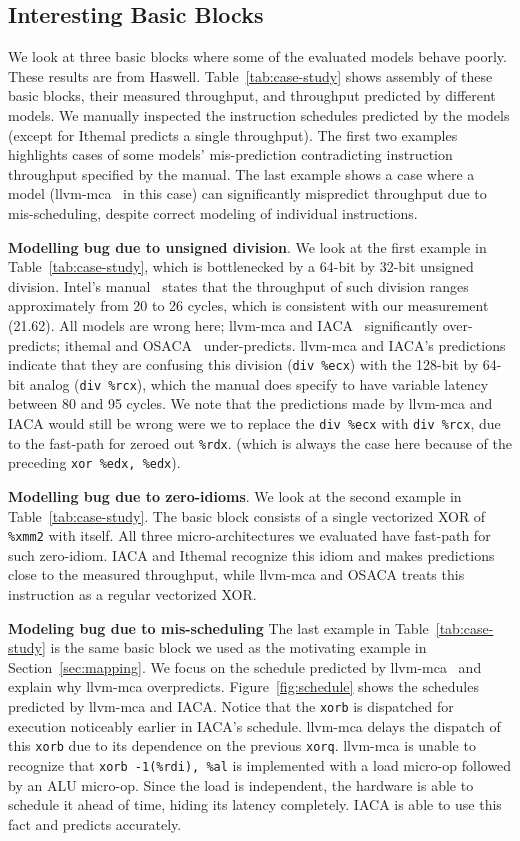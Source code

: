 \subsection{Interesting Basic Blocks}
We look at three basic blocks where some of the evaluated models behave poorly.
These results are from Haswell.
Table~\ref{tab:case-study} shows assembly of these basic blocks, their 
measured throughput, and throughput predicted by different models.
We manually inspected the instruction schedules predicted by the models
(except for Ithemal predicts a single throughput).
The first two examples highlights cases of some models' mis-prediction
contradicting instruction throughput specified by the manual.
The last example shows a case where a model (llvm-mca~\cite{llvm-mca} in this case) can significantly
mispredict throughput due to mis-scheduling, despite correct modeling of individual instructions.

\textbf{Modelling bug due to unsigned division}.
We look at the first example in Table~\ref{tab:case-study},
which is bottlenecked by a 64-bit by 32-bit unsigned division.
Intel's manual~\cite{intel-manual} states that the throughput of such division
ranges approximately from 20 to 26 cycles, which is consistent with our measurement (21.62).
All models are wrong here; llvm-mca and IACA~\cite{iaca} significantly over-predicts;
ithemal and OSACA~\cite{osaca} under-predicts.
llvm-mca and IACA's predictions indicate that they are confusing 
this division (\verb|div %ecx|) with the 128-bit by 64-bit analog (\verb|div %rcx|),
which the manual does specify to have variable latency between 80 and 95 cycles.
We note that the predictions made by llvm-mca and IACA would still be wrong
were we to replace the \verb|div %ecx| with \verb|div %rcx|,
due to the fast-path for zeroed out \verb|%rdx|.
(which is always the case here because of the preceding \verb|xor %edx, %edx|).

\textbf{Modelling bug due to zero-idioms}.
We look at the second example in Table~\ref{tab:case-study}.
The basic block consists of a single vectorized XOR of \verb|%xmm2| with itself.
All three micro-architectures we evaluated have fast-path for such zero-idiom.
IACA and Ithemal recognize this idiom and makes predictions close to the measured throughput,
while llvm-mca and OSACA treats this instruction as a regular vectorized XOR.

\textbf{Modeling bug due to mis-scheduling}
The last example in Table~\ref{tab:case-study} is the same basic block
we used as the motivating example in Section~\ref{sec:mapping}.
We focus on the schedule predicted by llvm-mca~\cite{llvm-mca}
and explain why llvm-mca overpredicts.
Figure~\ref{fig:schedule} shows the schedules predicted by llvm-mca and IACA.
Notice that the \verb|xorb| is dispatched for execution noticeably earlier in IACA's schedule.
llvm-mca delays the dispatch of this \verb|xorb| due to its dependence on the previous \verb|xorq|.
llvm-mca is unable to recognize that 
\verb|xorb -1(%rdi), %al| is implemented with a load micro-op followed by an ALU micro-op.
Since the load is independent, the hardware is able to schedule it ahead of time,
hiding its latency completely.
IACA is able to use this fact and predicts accurately.


